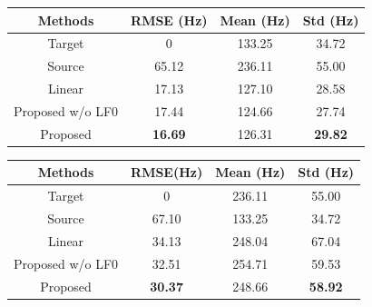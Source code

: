 \begin{table} 
    \centering 
    \begin{subtable}[t]{0.9\textwidth}
        \centering
        \begin{tabular}[t]{ cccc }
            \toprule
            Methods  & RMSE (Hz) & Mean (Hz) & Std (Hz) \\
            \midrule
            Target                  & 0 & 133.25 & 34.72             \\
            \midrule
            Source                    & 65.12 & 236.11 & 55.00            \\
            Linear                       & 17.13 & 127.10 & 28.58               \\
            Proposed w/o LF0                       & 17.44 & 124.66 & 27.74            \\
            Proposed                       & \textbf{16.69} & 126.31 & \textbf{29.82}   \\
            \bottomrule
            \end{tabular} 
        \label{tab:f0f2m}
    \end{subtable}
    \bigskip
    \vspace{1mm}
    \quad
    \begin{subtable}[t]{0.9\textwidth}
        \centering
        \begin{tabular}[t]{ cccc }
            \toprule
             Methods & RMSE(Hz) & Mean (Hz) & Std (Hz) \\
            \midrule
            Target                   & 0 & 236.11 & 55.00            \\
            \midrule
            Source                        & 67.10 & 133.25 & 34.72            \\
            Linear                     & 34.13 & 248.04 & 67.04              \\
            Proposed w/o LF0                   & 32.51 & 254.71 & 59.53              \\
            Proposed                      & \textbf{30.37} & 248.66 & \textbf{58.92}   \\
            \bottomrule
          \end{tabular}
        \label{tab:f0m2f}
    \end{subtable}


\end{table}
